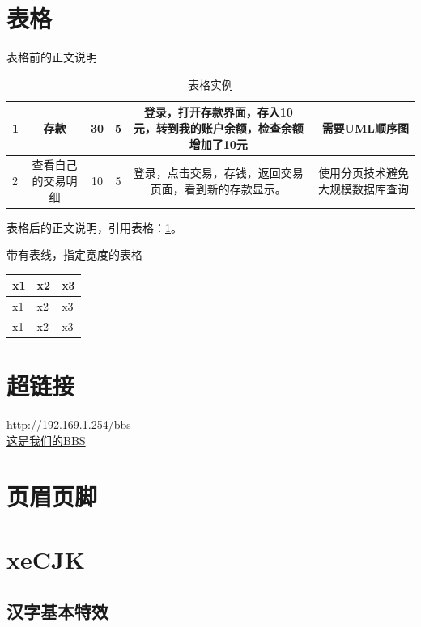 \documentclass[a4paper,12pt]{article} %
\begin{document}
\section{表格}
表格前的正文说明
\begin{table}[!th]
\begin{tabular}{|l|c|c|c|c|r|}
\toprule
1	&存款	&30	&5	&登录，打开存款界面，存入10元，转到我的账户余额，检查余额增加了10元	&需要UML顺序图	\\
\midrule
2	&查看自己的交易明细 &10 &5 &登录，点击交易，存钱，返回交易页面，看到新的存款显示。 &使用分页技术避免大规模数据库查询 \\
\bottomrule
\end{tabular}
\caption{表格实例}
\label{ex:table}
\end{table}
表格后的正文说明，引用表格：\ref{ex:table}。

{带有表线，指定宽度的表格}
\begin{table}[htbp]
  \centering
  \begin{tabular}{|p{80pt}|>{\centering}p{80pt}|>{\raggedleft\arraybackslash}p{80pt}|}
    \toprule
    x1  & x2  & x3\\
    \midrule
    x1  & x2  & x3\\
    x1  & x2  & x3\\
    \bottomrule
  \end{tabular}
\end{table}


\section{超链接}
\url{http://192.169.1.254/bbs}\\
\href{http://192.169.1.254/bbs}{这是我们的BBS}


\section{页眉页脚} %


\section{xeCJK}
\subsection{汉字基本特效}
\\
\\
\end{document}
